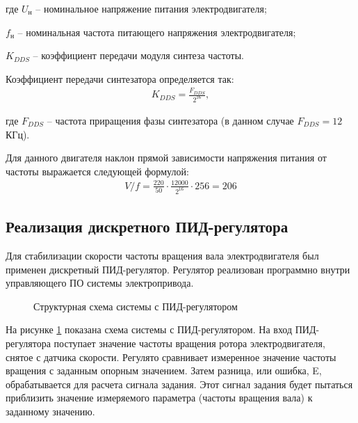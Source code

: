         где $U_\text{н}$ -- номинальное напряжение питания электродвигателя;\par
        $f_\text{н}$ -- номинальная частота питающего напряжения электродвигателя;\par
        $K_{DDS}$ -- коэффициент передачи модуля синтеза частоты.

        Коэффициент передачи синтезатора определяется так:
        \begin{gather*}
            K_{DDS} = \frac{F_{DDS}}{2^{16}},
        \end{gather*}

        где $F_{DDS}$ -- частота приращения фазы синтезатора (в данном случае
        $F_{DDS} = 12$ КГц).

        Для данного двигателя наклон прямой зависимости напряжения питания от
        частоты выражается следующей формулой:
        \begin{gather*}
            V/f = \frac{220}{50} \cdot \frac{12000}{2^{16}} \cdot 256 = 206
        \end{gather*}

    \subsection{Реализация дискретного ПИД-регулятора}
        Для стабилизации скорости частоты вращения вала электродвигателя был
        применен дискретный ПИД-регулятор. Регулятор реализован программно
        внутри управляющего ПО системы электропривода.

        \begin{figure}[h!]
            \caption{Структурная схема системы с ПИД-регулятором}
            \label{fig:system-with-pid}
        \end{figure}

        На рисунке \ref{fig:system-with-pid} показана схема системы с
        ПИД-регулятором. На вход ПИД-регулятора поступает значение частоты
        вращения ротора электродвигателя, снятое с датчика скорости. Регулято
        сравнивает измеренное значение частоты вращения  с заданным опорным
        значением. Затем разница, или ошибка, E, обрабатывается для расчета
        сигнала задания. Этот сигнал задания будет пытаться приблизить значение
        измеряемого параметра (частоты вращения вала) к заданному значению.


